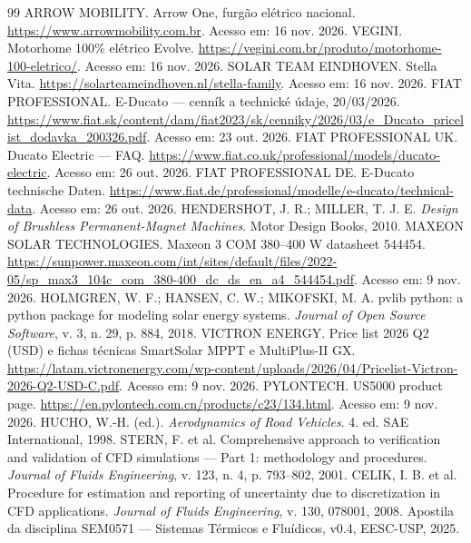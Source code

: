 \documentclass[11pt,a4paper]{article}
\begin{document}
\begin{thebibliography}{99}\small
{} ARROW MOBILITY. Arrow One, furgão elétrico nacional. \url{https://www.arrowmobility.com.br}. Acesso em: 16 nov. 2026.
 VEGINI. Motorhome 100\% elétrico Evolve. \url{https://vegini.com.br/produto/motorhome-100-eletrico/}. Acesso em: 16 nov. 2026.
 SOLAR TEAM EINDHOVEN. Stella Vita. \url{https://solarteameindhoven.nl/stella-family}. Acesso em: 16 nov. 2026.
 FIAT PROFESSIONAL. E-Ducato — cenník a technické údaje, 20/03/2026. \url{https://www.fiat.sk/content/dam/fiat2023/sk/cenniky/2026/03/e_Ducato_pricelist_dodavka_200326.pdf}. Acesso em: 23 out. 2026.
 FIAT PROFESSIONAL UK. Ducato Electric — FAQ. \url{https://www.fiat.co.uk/professional/models/ducato-electric}. Acesso em: 26 out. 2026.
 FIAT PROFESSIONAL DE. E-Ducato technische Daten. \url{https://www.fiat.de/professional/modelle/e-ducato/technical-data}. Acesso em: 26 out. 2026.
 HENDERSHOT, J. R.; MILLER, T. J. E. \emph{Design of Brushless Permanent-Magnet Machines}. Motor Design Books, 2010.
 MAXEON SOLAR TECHNOLOGIES. Maxeon 3 COM 380--400 W datasheet 544454. \url{https://sunpower.maxeon.com/int/sites/default/files/2022-05/sp_max3_104c_com_380-400_dc_ds_en_a4_544454.pdf}. Acesso em: 9 nov. 2026.
 HOLMGREN, W. F.; HANSEN, C. W.; MIKOFSKI, M. A. pvlib python: a python package for modeling solar energy systems. \emph{Journal of Open Source Software}, v. 3, n. 29, p. 884, 2018.
 VICTRON ENERGY. Price list 2026 Q2 (USD) e fichas técnicas SmartSolar MPPT e MultiPlus-II GX. \url{https://latam.victronenergy.com/wp-content/uploads/2026/04/Pricelist-Victron-2026-Q2-USD-C.pdf}. Acesso em: 9 nov. 2026.
 PYLONTECH. US5000 product page. \url{https://en.pylontech.com.cn/products/c23/134.html}. Acesso em: 9 nov. 2026.
 HUCHO, W.-H. (ed.). \emph{Aerodynamics of Road Vehicles}. 4. ed. SAE International, 1998.
 STERN, F. et al. Comprehensive approach to verification and validation of CFD simulations — Part 1: methodology and procedures. \emph{Journal of Fluids Engineering}, v. 123, n. 4, p. 793--802, 2001.
 CELIK, I. B. et al. Procedure for estimation and reporting of uncertainty due to discretization in CFD applications. \emph{Journal of Fluids Engineering}, v. 130, 078001, 2008.
 Apostila da disciplina SEM0571 — Sistemas Térmicos e Fluídicos, v0.4, EESC-USP, 2025.

\end{thebibliography}
\end{document}
